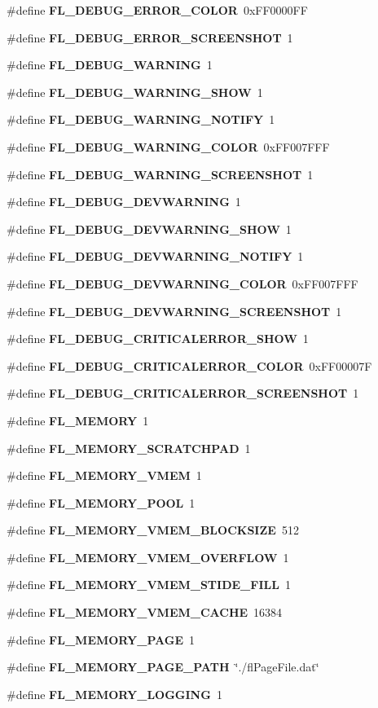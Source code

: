 \begin{CompactItemize}
\item 
\#define {\bf FL\_\-DEBUG\_\-ERROR\_\-COLOR}~0x\-FF0000FF
\item 
\#define {\bf FL\_\-DEBUG\_\-ERROR\_\-SCREENSHOT}~1
\item 
\#define {\bf FL\_\-DEBUG\_\-WARNING}~1
\item 
\#define {\bf FL\_\-DEBUG\_\-WARNING\_\-SHOW}~1
\item 
\#define {\bf FL\_\-DEBUG\_\-WARNING\_\-NOTIFY}~1
\item 
\#define {\bf FL\_\-DEBUG\_\-WARNING\_\-COLOR}~0x\-FF007FFF
\item 
\#define {\bf FL\_\-DEBUG\_\-WARNING\_\-SCREENSHOT}~1
\item 
\#define {\bf FL\_\-DEBUG\_\-DEVWARNING}~1
\item 
\#define {\bf FL\_\-DEBUG\_\-DEVWARNING\_\-SHOW}~1
\item 
\#define {\bf FL\_\-DEBUG\_\-DEVWARNING\_\-NOTIFY}~1
\item 
\#define {\bf FL\_\-DEBUG\_\-DEVWARNING\_\-COLOR}~0x\-FF007FFF
\item 
\#define {\bf FL\_\-DEBUG\_\-DEVWARNING\_\-SCREENSHOT}~1
\item 
\#define {\bf FL\_\-DEBUG\_\-CRITICALERROR\_\-SHOW}~1
\item 
\#define {\bf FL\_\-DEBUG\_\-CRITICALERROR\_\-COLOR}~0x\-FF00007F
\item 
\#define {\bf FL\_\-DEBUG\_\-CRITICALERROR\_\-SCREENSHOT}~1
\item 
\#define {\bf FL\_\-MEMORY}~1
\item 
\#define {\bf FL\_\-MEMORY\_\-SCRATCHPAD}~1
\item 
\#define {\bf FL\_\-MEMORY\_\-VMEM}~1
\item 
\#define {\bf FL\_\-MEMORY\_\-POOL}~1
\item 
\#define {\bf FL\_\-MEMORY\_\-VMEM\_\-BLOCKSIZE}~512
\item 
\#define {\bf FL\_\-MEMORY\_\-VMEM\_\-OVERFLOW}~1
\item 
\#define {\bf FL\_\-MEMORY\_\-VMEM\_\-STIDE\_\-FILL}~1
\item 
\#define {\bf FL\_\-MEMORY\_\-VMEM\_\-CACHE}~16384
\item 
\#define {\bf FL\_\-MEMORY\_\-PAGE}~1
\item 
\#define {\bf FL\_\-MEMORY\_\-PAGE\_\-PATH}~\char`\"{}./fl\-Page\-File.dat\char`\"{}
\item 
\#define {\bf FL\_\-MEMORY\_\-LOGGING}~1
\item 

\end{CompactItemize}
